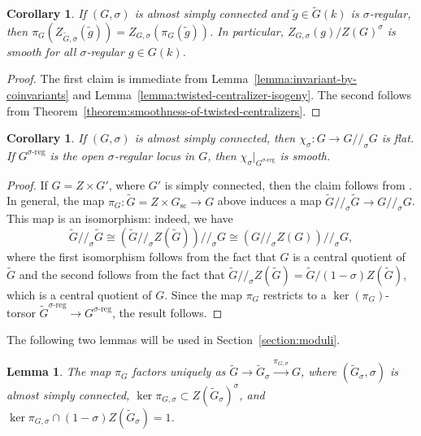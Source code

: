 \documentclass[11pt,reqno]{amsart}
\newtheorem{lemma}[theorem]{Lemma}
\newtheorem{cor}[theorem]{Corollary}
\theoremstyle{definition}
\renewcommand{\rm}{\mathrm}
\begin{document}
\begin{cor}\label{cor:asc-smooth}
    If $(G, \sigma)$ is almost simply connected and $\widetilde{g} \in \widetilde{G}(k)$ is $\sigma$-regular, then $\pi_G(Z_{\widetilde{G}, \sigma}(\widetilde{g})) = Z_{G, \sigma}(\pi_G(\widetilde{g}))$. In particular, $Z_{G, \sigma}(g)/Z(G)^\sigma$ is smooth for all $\sigma$-regular $g \in G(k)$.
\end{cor}

\begin{proof}
    The first claim is immediate from Lemma~\ref{lemma:invariant-by-coinvariants} and Lemma~\ref{lemma:twisted-centralizer-isogeny}. The second follows from Theorem~\ref{theorem:smoothness-of-twisted-centralizers}.
\end{proof}

\begin{cor}\label{cor:asc-adjoint-smooth}
    If $(G, \sigma)$ is almost simply connected, then $\chi_\sigma\colon G \to G/\!/_\sigma G$ is flat. If $G^{\sigma\textrm{-reg}}$ is the open $\sigma$-regular locus in $G$, then $\chi_\sigma|_{G^{\sigma\textrm{-reg}}}$ is smooth.
\end{cor}

\begin{proof}
    If $G = Z \times G'$, where $G'$ is simply connected, then the claim follows from \cite[Corollary 4.3.3, Corollary 5.3.3]{Xiao-Zhu}. In general, the map $\pi_G\colon \widetilde{G} = Z \times G_{\rm{sc}} \to G$ above induces a map $\widetilde{G}/\!/_\sigma\widetilde{G} \to G/\!/_\sigma G$. This map is an isomorphism: indeed, we have
    \[
    \widetilde{G}/\!/_\sigma \widetilde{G} \cong (\widetilde{G}/\!/_\sigma Z(\widetilde{G}))/\!/_\sigma G \cong (G/\!/_\sigma Z(G))/\!/_\sigma G,
    \]
    where the first isomorphism follows from the fact that $G$ is a central quotient of $\widetilde{G}$ and the second follows from the fact that $\widetilde{G}/\!/_\sigma Z(\widetilde{G}) = \widetilde{G}/(1-\sigma)Z(\widetilde{G})$, which is a central quotient of $G$. Since the map $\pi_G$ restricts to a $\ker(\pi_G)$-torsor $\widetilde{G}^{\sigma\textrm{-reg}} \to G^{\sigma\textrm{-reg}}$, the result follows.
\end{proof}

The following two lemmas will be used in Section~\ref{section:moduli}.

\begin{lemma}\label{lemma:almost-simply-connected}
    The map $\pi_G$ factors uniquely as $\widetilde{G} \to \widetilde{G}_\sigma \xrightarrow[]{\pi_{G,\sigma}} G$, where $(\widetilde{G}_\sigma, \sigma)$ is almost simply connected, $\ker \pi_{G,\sigma} \subset Z(\widetilde{G}_\sigma)^\sigma$, and $\ker \pi_{G,\sigma} \cap (1-\sigma)Z(\widetilde{G}_\sigma) = 1$.
\end{lemma}
\end{document}
